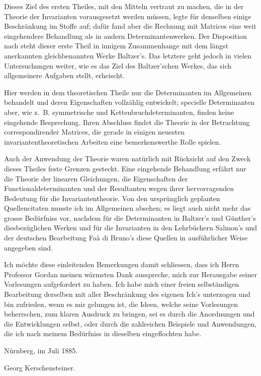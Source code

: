 \documentclass[10pt]{article}
\begin{document}
Dieses Ziel des ersten Theiles, mit den Mitteln vertraut zu machen, die in der Theorie der Invarianten vorausgesetzt werden müssen, legte für denselben einige Beschränkung im Stoffe auf; dafür fand aber die Rechnung mit Matrices eine weit eingehendere Behandlung als in andern Determinantenwerken. Der Disposition nach steht dieser erste Theil in innigem Zusammenhange mit dem längst anerkannten gleichbenannten Werke Baltzer's. Das letztere geht jedoch in vielen Untersuchungen weiter, wie es das Ziel des Baltzer'schen Werkes, das sich allgemeinere Aufgaben stellt, erheischt.

Hier werden in dem theoretischen Theile nur die Determinanten im Allgemeinen behandelt und deren Eigenschaften vollzählig entwickelt; specielle Determinanten aber, wie z.\ B. symmetrische und Kettenbruchdeterminanten, finden keine eingehende Besprechung. Ihren Abschluss findet die Theorie in der Betrachtung correspondirender Matrices, die gerade in einigen neuesten invariantentheoretischen Arbeiten eine bemerkenswerthe Rolle spielen.

Auch der Anwendung der Theorie waren natürlich mit Rücksicht auf den Zweck dieses Theiles feste Grenzen gesteckt. Eine eingehende Behandlung erfährt nur die Theorie der linearen Gleichungen, die Eigenschaften der Functionaldeterminanten und der Resultanten wegen ihrer hervorragenden Bedeutung für die Invariantentheorie. Von den ursprünglich geplanten Quellencitaten musste ich im Allgemeinen absehen; es liegt auch nicht mehr das grosse Bedürfniss vor, nachdem für die Determinanten in Baltzer's und Günther's diesbezüglichen Werken und für die Invarianten in den Lehrbüchern Salmon's und der deutschen Bearbeitung Faà di Bruno's diese Quellen in ausführlicher Weise angegeben sind.

Ich möchte diese einleitenden Bemerkungen damit schliessen, dass ich Herrn Professor Gordan meinen wärmsten Dank ausspreche, mich zur Herausgabe seiner Vorlesungen aufgefordert zu haben. Ich habe mich einer freien selbständigen Bearbeitung derselben mit aller Beschränkung des eigenen Ich's unterzogen und bin zufrieden, wenn es mir gelungen ist, die Ideen, welche seine Vorlesungen beherrschen, zum klaren Ausdruck zu bringen, sei es durch die Anordnungen und die Entwicklungen selbst, oder durch die zahlreichen Beispiele und Anwendungen, die ich nach meinem Bedürfniss in dieselben eingeflochten habe.

\begin{flushleft}
Nürnberg, im Juli 1885.
\end{flushleft}
\begin{flushright}
Georg Kerschensteiner.
\end{flushright}
\end{document}
